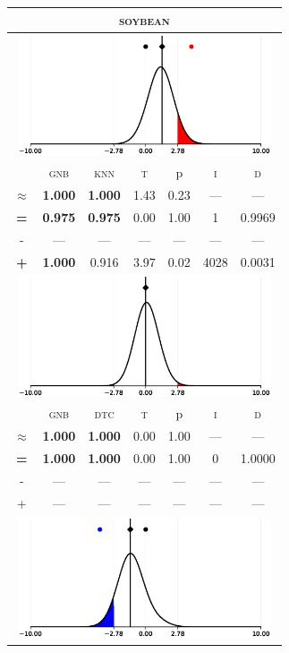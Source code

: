 \begin{tabular}{c||cc||c|c|c||c}
	\toprule
	\multicolumn{7}{c}{\textsc{soybean}}\\
	\bottomrule
	\multicolumn{7}{c}{\includegraphics[width=7.5cm, trim=30 0 30 0]{figures/soybean_0.eps}}\\

\midrule	&\textsc{gnb} & \textsc{knn} & \textsc{t} & p & \textsc{i} & \textsc{d}\\
	\color{black} $\approx$ & \color{black} \bfseries 1.000 &\color{black}  \bfseries 1.000 & 1.43 & 0.23 & --- & ---\\\midrule
	{\bfseries\color{black}\tiny=}& \color{black} \bfseries 0.975 & \color{black} \bfseries 0.975 & 0.00 & 1.00 & 1 & \color{black} 0.9969\\
	{\tiny-}& --- & --- & --- & --- & --- & ---\\
	{\bfseries\color{red}\tiny+}& \color{red} \bfseries 1.000 & \color{red}  0.916 & 3.97 & 0.02 & 4028 & \color{red} 0.0031\\
	\bottomrule
	\multicolumn{7}{c}{\includegraphics[width=7.5cm, trim=30 0 30 0]{figures/soybean_1.eps}}\\

\midrule	&\textsc{gnb} & \textsc{dtc} & \textsc{t} & p & \textsc{i} & \textsc{d}\\
	\color{black} $\approx$ & \color{black} \bfseries 1.000 &\color{black}  \bfseries 1.000 & 0.00 & 1.00 & --- & ---\\\midrule
	{\bfseries\color{black}\tiny=}& \color{black} \bfseries 1.000 & \color{black} \bfseries 1.000 & 0.00 & 1.00 & 0 & \color{black} 1.0000\\
	{\tiny-}& --- & --- & --- & --- & --- & ---\\
	{\tiny+}& --- & --- & --- & --- & --- & ---\\
	\bottomrule
	\multicolumn{7}{c}{\includegraphics[width=7.5cm, trim=30 0 30 0]{figures/soybean_2.eps}}\\


\end{tabular}
